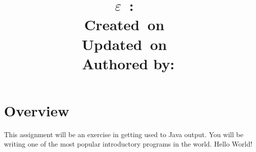 \documentclass{report}
\title{
\vspace{2in}
\textmd{\textbf{\hmwkDesDiff$\varepsilon$\hmwkDesTime\ :\ \hmwkTitle}}\\
\normalsize\vspace{0.1in}\small{Created\ on\ \hmwkCreationDate}\\
\normalsize\vspace{0.1in}\small{Updated\ on\ \hmwkUpdateDate}\\
\vspace{3in}
Authored by:
}
\author{\textbf{\hmwkAuthorName}}
\date{}
\begin{document}
\maketitle



\newpage
\tableofcontents
\newpage


\section{Overview}
\hspace{2em}\large{This assignment will be an exercise in getting used to Java output. You will be writing one of the most popular introductory programs in the world. Hello World!}\\
\end{document}
